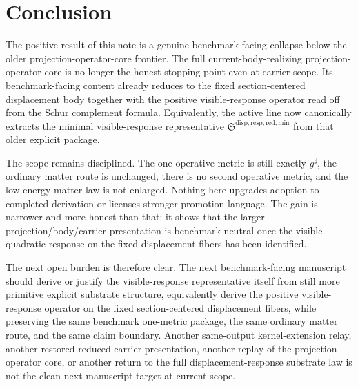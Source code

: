 \documentclass[11pt]{article}
\newcommand{\CompletedMetric}{g^{\sharp}}
\newcommand{\MinimalReducedStructure}{\mathfrak S^{\mathrm{disp,resp,red,min}}}
\begin{document}
\section{Conclusion}

The positive result of this note is a genuine benchmark-facing collapse below the older projection-operator-core frontier. The full current-body-realizing projection-operator core is no longer the honest stopping point even at carrier scope. Its benchmark-facing content already reduces to the fixed section-centered displacement body together with the positive visible-response operator read off from the Schur complement formula. Equivalently, the active line now canonically extracts the minimal visible-response representative \(\MinimalReducedStructure\) from that older explicit package.

The scope remains disciplined. The one operative metric is still exactly \(\CompletedMetric\), the ordinary matter route is unchanged, there is no second operative metric, and the low-energy matter law is not enlarged. Nothing here upgrades adoption to completed derivation or licenses stronger promotion language. The gain is narrower and more honest than that: it shows that the larger projection/body/carrier presentation is benchmark-neutral once the visible quadratic response on the fixed displacement fibers has been identified.

The next open burden is therefore clear. The next benchmark-facing manuscript should derive or justify the visible-response representative itself from still more primitive explicit substrate structure, equivalently derive the positive visible-response operator on the fixed section-centered displacement fibers, while preserving the same benchmark one-metric package, the same ordinary matter route, and the same claim boundary. Another same-output kernel-extension relay, another restored reduced carrier presentation, another replay of the projection-operator core, or another return to the full displacement-response substrate law is not the clean next manuscript target at current scope.
\end{document}

